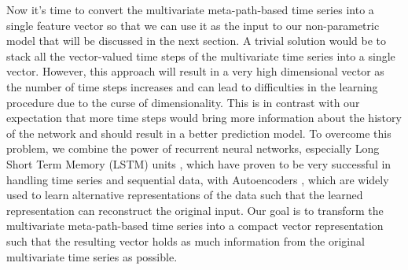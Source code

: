 Now it's time to convert the multivariate meta-path-based time series into a single feature vector so that we can use it as the input to our non-parametric model that will be discussed in the next section. A trivial solution would be to stack all the vector-valued time steps of the multivariate time series into a single vector. However, this approach will result in a very high dimensional vector as the number of time steps increases and can lead to difficulties in the learning procedure due to the curse of dimensionality. This is in contrast with our expectation that more time steps would bring more information about the history of the network and should result in a better prediction model. To overcome this problem, we combine the power of recurrent neural networks, especially Long Short Term Memory (LSTM) units \cite{hochreiter1997long}, which have proven to be very successful in handling time series and sequential data, with Autoencoders \cite{bengio2009learning}, which are widely used to learn alternative representations of the data such that the learned representation can reconstruct the original input. Our goal is to transform the multivariate meta-path-based time series into a compact vector representation such that the resulting vector holds as much information from the original multivariate time series as possible.

